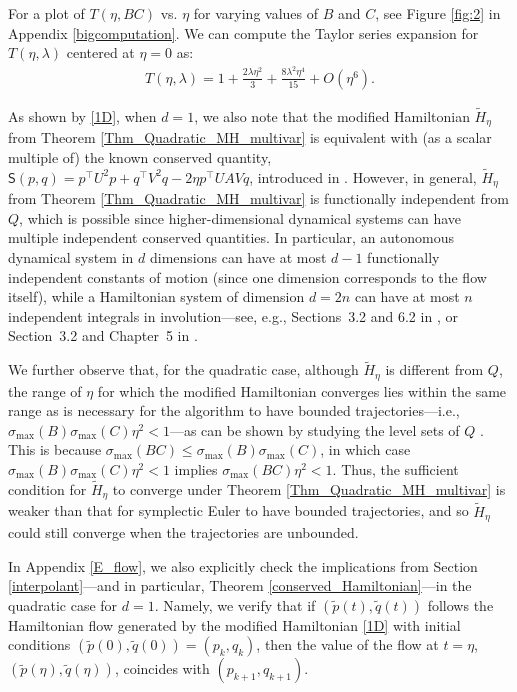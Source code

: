 \documentclass[11pt]{article}
\begin{document}
For a plot of $T(\eta, BC)$ vs. $\eta$ for varying values of $B$ and $C$, see Figure \ref{fig:2} in Appendix \ref{bigcomputation}. 
We can compute the Taylor series expansion for $T(\eta, \lambda)$ centered at $\eta=0$ as: 
\begin{align*}
    T(\eta, \lambda)=1+\frac{2\lambda\eta^2}{3}+\frac{8\lambda^{2}\eta^4}{15}+ O(\eta^6).
\end{align*}

As shown by \eqref{1D}, when $d=1$, we also note that the modified Hamiltonian $\tilde H_\eta$ from Theorem \ref{Thm_Quadratic_MH_multivar} is equivalent with (as a scalar multiple of) the known conserved quantity, $\mathsf{S}\left(p,q\right)=p^{\top}U^{2}p+q^{\top}V^{2}q-2\eta p^{\top}UAVq$, introduced in \cite{pmlr-v125-bailey20a}. However, in general, $\widetilde{H}_{\eta}$ from Theorem \ref{Thm_Quadratic_MH_multivar} is functionally independent from $Q$, which is possible since higher-dimensional dynamical systems can have multiple independent conserved quantities. In particular, an autonomous dynamical system in $d$ dimensions can have at most $d-1$ functionally independent constants of motion (since one dimension corresponds to the flow itself), while a Hamiltonian system of dimension $d=2n$ can have at most $n$ independent integrals in involution---see, e.g., Sections~3.2 and 6.2 in 
\cite{Jose1998}, or Section~3.2 and Chapter~5 in \cite{Arnold2006}.

We further observe that, for the quadratic case, although $\widetilde{H}_{\eta}$ is different from $Q$, the range of $\eta$ for which the modified Hamiltonian converges lies within the same range as is necessary for the algorithm to have bounded trajectories---i.e., $\sigma_{\max}\left(B\right)\sigma_{\max}\left(C\right)\eta^2<1$---as can be shown by studying the level sets of $Q$ \citep[Theorem~5]{pmlr-v125-bailey20a}. This is because $\sigma_{\max}\left(BC\right)\leq\sigma_{\max}\left(B\right)\sigma_{\max}\left(C\right)$, in which case $\sigma_{\max}\left(B\right)\sigma_{\max}\left(C\right)\eta^2<1$ implies $\sigma_{\max}\left(BC\right)\eta^2<1$. Thus, the sufficient condition for $\widetilde{H}_{\eta}$ to converge under Theorem \ref{Thm_Quadratic_MH_multivar} is weaker than that for symplectic Euler to have bounded trajectories, and so $\widetilde{H}_{\eta}$ could still converge when the trajectories are unbounded.

In Appendix \ref{E_flow}, we also explicitly check the implications from Section \ref{interpolant}---and in particular, Theorem \ref{conserved_Hamiltonian}---in the quadratic case for $d=1$. Namely, we verify that if $(\tilde{p}(t), \tilde{q}(t))$ follows the Hamiltonian flow generated by the modified Hamiltonian \eqref{1D} with initial conditions $\left( \tilde{p}(0), \tilde{q}(0) \right)=\left(p_{k}, q_{k}\right)$, then the value of the flow at $t=\eta$, $\left( \tilde{p}(\eta), \tilde{q}(\eta) \right)$, coincides with $\left(p_{k+1}, q_{k+1}\right)$. 
\end{document}
